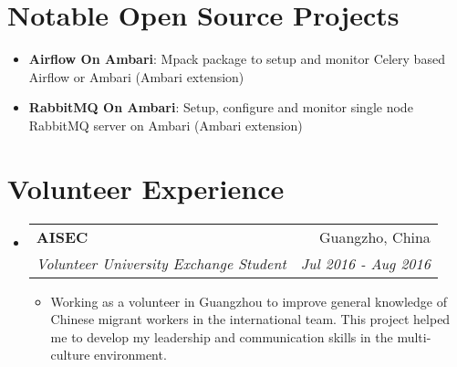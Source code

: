 \documentclass[letterpaper,11pt]{article}
\makeatletter
\newcommand{\resumeItem}[2]{
  \item\small{
    \textbf{#1}{: #2 \vspace{-2pt}}
  }
}
\newcommand{\resumeItemSimple}[1]{
  \item\small{#1 \vspace{-2pt}}
}
\newcommand{\resumeSubheading}[5]{
  \vspace{-1pt}\item
    \begin{tabular*}{0.97\textwidth}[t]{l@{\extracolsep{\fill}}r}
      \textbf{#1} \textit{\small{#5}}  & #2 \\
      \textit{\small #3} & \textit{\small #4} \\
    \end{tabular*}\vspace{-5pt}
}
\newcommand{\resumeSubItem}[2]{\resumeItem{#1}{#2}\vspace{-4pt}}
\newcommand{\resumeSubHeadingListStart}{\begin{itemize}[leftmargin=*]}
\newcommand{\resumeSubHeadingListEnd}{\end{itemize}}
\newcommand{\resumeItemListStart}{\begin{itemize}}
\newcommand{\resumeItemListEnd}{\end{itemize}\vspace{-5pt}}
\makeatother
\begin{document}
\section{Notable Open Source Projects}
  \resumeSubHeadingListStart
    \resumeSubItem{Airflow On Ambari}{Mpack package to setup and monitor Celery based Airflow or Ambari (Ambari extension)}
    \resumeSubItem{RabbitMQ On Ambari}
      {Setup, configure and monitor single node RabbitMQ server on Ambari (Ambari extension)}
  \resumeSubHeadingListEnd

\section{Volunteer Experience}
  \resumeSubHeadingListStart
    \resumeSubheading
      {AISEC}{Guangzho, China}
      {Volunteer University Exchange Student}{Jul 2016 - Aug 2016}{}
    \resumeItemListStart
    	\resumeItemSimple{Working as a volunteer in Guangzhou to improve general knowledge of Chinese migrant workers in the international team. This project helped me to develop my leadership and communication skills in the multi-culture environment.}
    \resumeItemListEnd	 		
  \resumeSubHeadingListEnd

\end{document}
